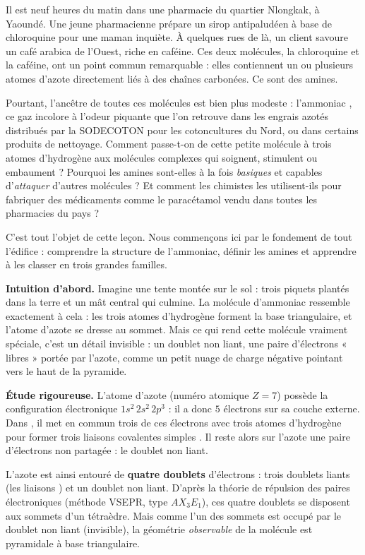 \documentclass[11pt]{article}
\newcommand{\cle}[1]{{\popxbold\color{popdark}#1}}
\newcounter{popsec}
\newcounter{popsub}
\newcommand{\courssub}[1]{%
  \stepcounter{popsub}%
  \par\vspace{9pt}\noindent{\popxbold\fontsize{11.5}{13}\selectfont\color{popink}{\color{poporange}\thepopsec.\thepopsub}\hspace{6pt}#1}\par\nopagebreak\vspace{4pt}
}
\begin{document}
Il est neuf heures du matin dans une pharmacie du quartier Nlongkak, à Yaoundé. Une jeune pharmacienne prépare un sirop antipaludéen à base de chloroquine pour une maman inquiète. À quelques rues de là, un client savoure un café arabica de l'Ouest, riche en caféine. Ces deux molécules, la chloroquine et la caféine, ont un point commun remarquable : elles contiennent un ou plusieurs atomes d'\cle{azote} directement liés à des chaînes carbonées. Ce sont des \cle{amines}.

Pourtant, l'ancêtre de toutes ces molécules est bien plus modeste : l'\cle{ammoniac} , ce gaz incolore à l'odeur piquante que l'on retrouve dans les engrais azotés distribués par la SODECOTON pour les cotoncultures du Nord, ou dans certains produits de nettoyage. Comment passe-t-on de cette petite molécule à trois atomes d'hydrogène aux molécules complexes qui soignent, stimulent ou embaument ? Pourquoi les amines sont-elles à la fois \emph{basiques} et capables d'\emph{attaquer} d'autres molécules ? Et comment les chimistes les utilisent-ils pour fabriquer des médicaments comme le paracétamol vendu dans toutes les pharmacies du pays ?

C'est tout l'objet de cette leçon. Nous commençons ici par le fondement de tout l'édifice : comprendre la structure de l'ammoniac, définir les amines et apprendre à les classer en trois grandes familles.

\courssub{Structure de la molécule d'ammoniac \ce{NH3}}

\textbf{Intuition d'abord.} Imagine une tente montée sur le sol : trois piquets plantés dans la terre et un mât central qui culmine. La molécule d'ammoniac ressemble exactement à cela : les trois atomes d'hydrogène forment la base triangulaire, et l'atome d'azote se dresse au sommet. Mais ce qui rend cette molécule vraiment spéciale, c'est un détail invisible : un \cle{doublet non liant}, une paire d'électrons « libres » portée par l'azote, comme un petit nuage de charge négative pointant vers le haut de la pyramide.

\textbf{Étude rigoureuse.} L'atome d'azote (numéro atomique $Z = 7$) possède la configuration électronique $1s^2\,2s^2\,2p^3$ : il a donc $5$ électrons sur sa couche externe. Dans , il met en commun trois de ces électrons avec trois atomes d'hydrogène pour former trois \cle{liaisons covalentes} simples . Il reste alors sur l'azote une paire d'électrons non partagée : le \cle{doublet non liant}.

L'azote est ainsi entouré de \textbf{quatre doublets} d'électrons : trois doublets liants (les liaisons ) et un doublet non liant. D'après la théorie de répulsion des paires électroniques (méthode VSEPR, type $AX_3E_1$), ces quatre doublets se disposent aux sommets d'un tétraèdre. Mais comme l'un des sommets est occupé par le doublet non liant (invisible), la géométrie \emph{observable} de la molécule est \cle{pyramidale} à base triangulaire.
\end{document}
